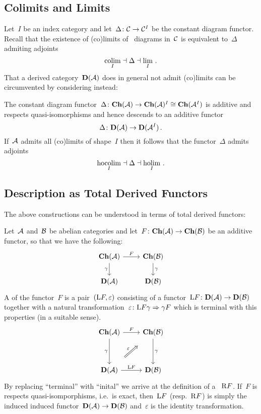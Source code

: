 \documentclass[a4paper,10pt]{scrartcl}
\begin{document}
\subsection{Colimits and Limits}

Let~$I$ be an index category and let~$\Delta \colon \mathcal{C} \to \mathcal{C}^I$ be the constant diagram functor.
Recall that the existence of (co)limits of~{} diagrams in~$\mathcal{C}$ is equivalent to~$\Delta$ admiting adjoints
\[
  \operatorname*{colim}_I \mathrel{\dashv} \Delta \mathrel{\dashv} \lim_I \,.
\]
That a derived category~$\mathbf{D}(\mathcal{A})$ does in general not admit (co)limits can be circumvented by considering  instead:

The constant diagram functor~$\Delta \colon \mathbf{Ch}(\mathcal{A}) \to \mathbf{Ch}(\mathcal{A})^I \cong \mathbf{Ch}(\mathcal{A}^I)$ is additive and respects quasi-isomorphisms and hence descends to an additive functor
\[
  \Delta
  \colon
  \mathbf{D}(\mathcal{A}) \to \mathbf{D}(\mathcal{A}^I) \,.
\]
If~$\mathcal{A}$ admits all (co)limits of shape~$I$ then it follows that the functor~$\Delta$ admits adjoints
\[
  \operatorname*{hocolim}_I \mathrel{\dashv} \Delta \mathrel{\dashv} \operatorname*{holim}_I \,.
\]



\subsection{Description as Total Derived Functors}

The above constructions can be understood in terms of total derived functors:

Let~$\mathcal{A}$ and~$\mathcal{B}$ be abelian categories and let~$F \colon \mathbf{Ch}(\mathcal{A}) \to \mathbf{Ch}(\mathcal{B})$ be an additive functor, so that we have the following:
\[
  \begin{tikzcd}
    \Ch(\Acat)
    \arrow{r}[above]{F}
    \arrow{d}[left]{\gamma}
    &
    \Ch(\Bcat)
    \arrow{d}[right]{\gamma}
    \\
    \Derived(\Acat)
    &
    \Derived(\Bcat)
  \end{tikzcd}
\]
A  of the functor~$F$ is a pair~$(\mathrm{L} F, \varepsilon)$ consisting of a functor~$\mathrm{L} F \colon \mathbf{D}(\mathcal{A}) \to \mathbf{D}(\mathcal{B})$ together with a natural transformation~$\varepsilon \colon \mathrm{L} F \gamma \Rightarrow \gamma F$ which is terminal with this properties (in a suitable sense).
\[
  \begin{tikzcd}[row sep = huge]
    \Ch(\Acat)
    \arrow{r}[above]{F}
    \arrow{d}[left]{\gamma}
    &
    \Ch(\Bcat)
    \arrow{d}[right]{\gamma}
    \\
    \Derived(\Acat)
    \arrow{r}[above]{\Left F}
    \arrow[Rightarrow, shorten <= 1.5em, shorten >= 1.5em]{ur}[above left]{\varepsilon}
    &
    \Derived(\Bcat)
  \end{tikzcd}
\]
By replacing \enquote{terminal} with \enquote{inital} we arrive at the definition of a ~$\mathrm{R} F$.
If~$F$ is respects quasi-isomporphisms, i.e.\ is exact, then~$\mathrm{L} F$ (resp.~$\mathrm{R} F$) is simply the induced induced functor~$\mathbf{D}(\mathcal{A}) \to \mathbf{D}(\mathcal{B})$ and~$\varepsilon$ is the identity transformation.
\end{document}

